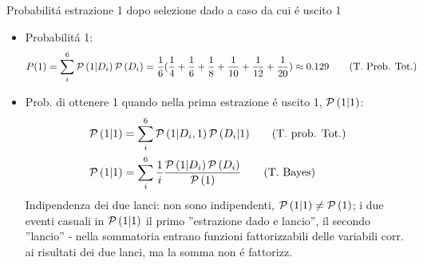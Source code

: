 \documentclass[asd-beamer.tex]{subfiles}
\begin{document}
\begin{frame}{Probabilit\'a estrazione 1 dopo selezione dado a caso da cui \'e uscito 1}
\begin{itemize}
\item Probabilit\'a 1:
\begin{align*}
&P(1)=\sum_i^6\operatorname{\mathcal{P}}{(1|D_i)}\operatorname{\mathcal{P}}{(D_i)}=\frac{1}{6}(\frac{1}{4}+\frac{1}{6}+\frac{1}{8}+\frac{1}{10}+\frac{1}{12}+\frac{1}{20})\approx0.129\tag{T. Prob. Tot.}
\end{align*}
\item Prob. di ottenere 1 quando nella prima estrazione \'e uscito 1, $\operatorname{\mathcal{P}}{(1|1)}$:
\begin{align*}
&\operatorname{\mathcal{P}}{(1|1)}=\sum_i^6\operatorname{\mathcal{P}}{(1|D_i,1)}\operatorname{\mathcal{P}}{(D_i|1)}\tag{T. prob. Tot.}\\
&\operatorname{\mathcal{P}}{(1|1)}=\sum_i^6\frac{1}{i}\frac{\operatorname{\mathcal{P}}{(1|D_i)\operatorname{\mathcal{P}}{(D_i)}}}{\operatorname{\mathcal{P}}{(1)}}\tag{T. Bayes}
\end{align*}
Indipendenza dei due lanci: non sono indipendenti, $\operatorname{\mathcal{P}}{(1|1)}\neq\operatorname{\mathcal{P}}{(1)}$; i due eventi casuali in $\operatorname{\mathcal{P}}{(1|1)}$ il primo ''estrazione dado e lancio'', il secondo ''lancio'' - nella sommatoria entrano funzioni fattorizzabili delle variabili corr. ai risultati dei due lanci, ma la somma non \'e fattorizz.
\end{itemize}
\end{frame}
\end{document}

